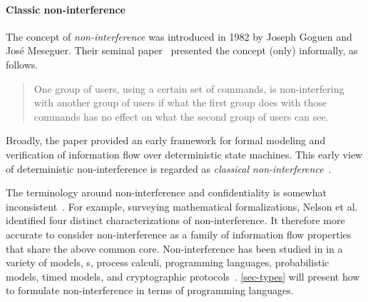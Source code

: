 \paragraph*{Classic non-interference}
The concept of \emph{non-interference} was introduced in 1982 by Joseph Goguen and José Meseguer.
Their seminal paper~\cite{goguen1982} presented the concept (only) informally, as follows.
\begin{quotation}
\noindent One group of users, using a certain set of commands, is non-interfering with another group of users if what the first group does with those commands has no effect on what the second group of users can see.
\end{quotation}
Broadly, the paper provided an early framework for formal modeling and verification of information flow
over deterministic state machines.
This early view of deterministic non-interference is regarded as \emph{classical non-interference}~\cite{focardi1997}.

The terminology around non-interference and confidentiality 
is somewhat inconsistent~\cite{sabelfeld2003,vandermeyden2007}.
For example, surveying mathematical formalizations, Nelson et al.~\cite{nelson2020} 
identified four distinct characterizations of non-interference.
It therefore more accurate to consider non-interference as a family of 
information flow properties that share the above common core.
Non-interference has been studied in in a variety of models, 
\eg {}s,
process calculi, programming languages, probabilistic models, timed models, and {cryptographic protocols}~\cite{bossi2005}.
\autoref{sec-types} will present how to formulate non-interference in terms of programming languages.

